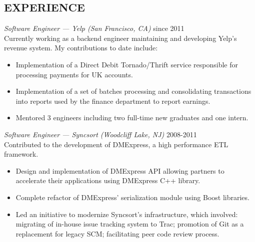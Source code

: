 \documentclass[line,margin]{res}
\begin{document}
\address{
    1335 Clay street,
    San Francisco, 94109, CA
}
\address{+1 (551) 208-4129}

\begin{resume}

\section{EXPERIENCE}
                {\sl Software Engineer --- Yelp (San Francisco, CA)} \hfill since 2011 \\
                Currently working as a backend engineer maintaining and developing Yelp's revenue system. My contributions to date include:
                \begin{itemize}  \itemsep -2pt
                    \item Implementation of a Direct Debit Tornado/Thrift service responsible for processing payments for UK accounts.
                    \item Implementation of a set of batches processing and consolidating transactions into reports used by the finance department to report earnings.
                    \item Mentored 3 engineers including two full-time new graduates and one intern.
                \end{itemize}

                {\sl Software Engineer --- Syncsort (Woodcliff Lake, NJ)} \hfill 2008-2011 \\
                Contributed to the development of DMExpress, a high performance ETL framework.
                \begin{itemize}  \itemsep -2pt
                    \item Design and implementation of DMExpress API allowing partners to accelerate their applications using DMExpress C++ library.
                    \item Complete refactor of DMExpress' serialization module using Boost libraries.
                    \item Led an initiative to modernize Syncsort's infrastructure, which involved: migrating of in-house issue tracking system to Trac; promotion of Git as a replacement for legacy SCM; facilitating peer code review process.
                \end{itemize}


\end{resume}
\end{document}
